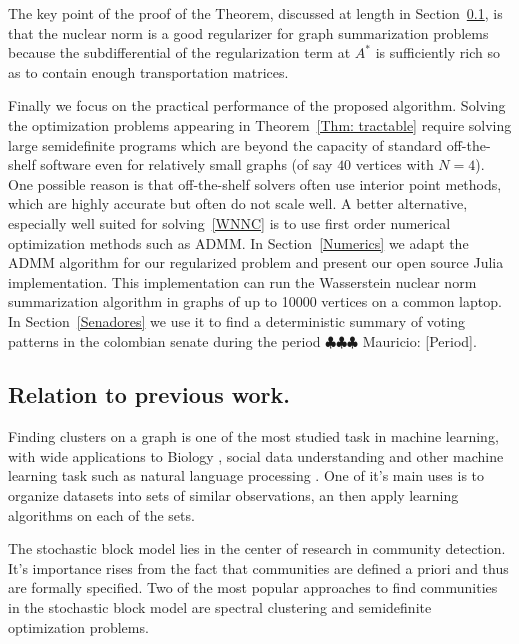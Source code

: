 \documentclass[12pt]{amsart}
\theoremstyle{remark}
\newcommand{\mv}[1]{{\color{red} \sf $\clubsuit\clubsuit\clubsuit$ Mauricio: [#1]}}
\begin{document}
The key point of the proof of the Theorem, discussed at length in Section~\ref{}, is that the nuclear norm is a good regularizer for graph summarization problems because the subdifferential of the regularization term at $A^*$ is sufficiently rich so as to contain enough transportation matrices. 

Finally we focus on the practical performance of the proposed algorithm. Solving the optimization problems appearing in Theorem~\ref{Thm: tractable} require solving large semidefinite programs which are beyond the  capacity of standard off-the-shelf software even for relatively small graphs (of say $40$ vertices with $N=4$). One possible reason is that off-the-shelf solvers often use interior point methods, which are highly accurate but often do not scale well. A better alternative, especially well suited for solving~\ref{WNNC} is to use first order numerical optimization methods such as ADMM. In Section~\ref{Numerics} we adapt the ADMM algorithm for our regularized problem and present our open source Julia implementation. This implementation can run the Wasserstein nuclear norm summarization algorithm in graphs of up to 10000 vertices on a common laptop. In Section~\ref{Senadores} we use it to find a deterministic summary of voting patterns in the colombian senate during the period \mv{Period}. 

\subsection{Relation to previous work.}



Finding clusters on a graph is one of the most studied task in machine learning, with wide applications to Biology \cite{cabreros2016detecting, cline2007integration,xu2002clustering}, social data understanding \cite{domingos2001mining,mishra2007clustering,newman2002random} and other machine learning task such as natural language processing \cite{collobert2011natural,ratinov2009design}. One of it's main uses is to organize datasets into sets of similar observations, an then apply learning algorithms on each of the sets.  

The stochastic block model lies in the center of research in community detection. It's importance rises from the fact that communities are defined a priori and thus are formally specified.
Two of the most popular approaches to find communities in the stochastic block model are spectral clustering and semidefinite optimization problems.
\end{document}
